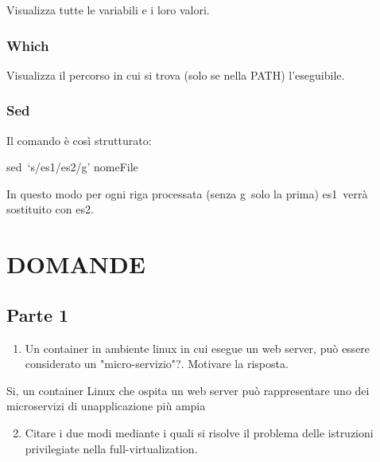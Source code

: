 \documentclass[
]{article}
\providecommand{\tightlist}{%
  \setlength{\itemsep}{0pt}\setlength{\parskip}{0pt}}
\begin{document}
{Visualizza tutte le variabili e i loro valori.}

\subsubsection{\texorpdfstring{{Which}}{Which}}\label{h.gapcjj5hdjx}

{Visualizza il percorso in cui si trova (solo se nella PATH)
l'eseguibile.}

\subsubsection{\texorpdfstring{{Sed}}{Sed}}\label{h.7rz3gslfum6k}

{Il comando è così strutturato:}

{sed}{~`}{s}{/es1/es2/}{g}{' nomeFile}

{In questo modo per ogni riga processata (senza }{g}{~solo la prima)
}{es1}{~verrà sostituito con }{es2}{.}

{}

{}

{}

{}

{}

{}

{}

\section{\texorpdfstring{{DOMANDE}}{DOMANDE}}\label{h.y4gl3bst2hll}

{}

\subsection{\texorpdfstring{{Parte 1}}{Parte 1}}\label{h.q1i6nkap762d}

\begin{enumerate}
\tightlist
\item
  {Un container in ambiente linux in cui esegue un web server, può
  essere considerato un "micro-servizio"?. Motivare la risposta. }
\end{enumerate}

{}

{Si, un container Linux che ospita un web server può rappresentare uno
dei microservizi di un\textquotesingle applicazione più ampia}

{}

{}

\begin{enumerate}
\setcounter{enumi}{1}
\tightlist
\item
  {Citare i due modi mediante i quali si risolve il problema delle
  istruzioni privilegiate nella full-virtualization. }
\end{enumerate}
\end{document}
